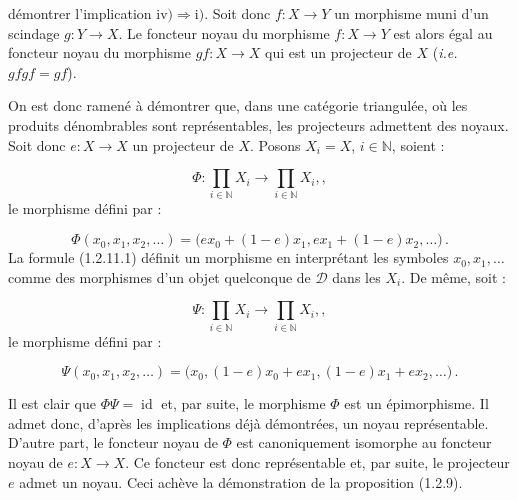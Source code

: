\clearpage
{}%
\begingroup
\small
\setlength{\emergencystretch}{1.5em}%
\setlength{\abovedisplayskip}{4pt plus 2pt minus 2pt}%
\setlength{\belowdisplayskip}{4pt plus 2pt minus 2pt}%

démontrer l'implication $\mathrm{iv)}\Longrightarrow\mathrm{i)}$. Soit donc
$f\colon X\longrightarrow Y$ un morphisme muni d'un scindage
$g\colon Y\longrightarrow X$. Le foncteur noyau du morphisme
$f\colon X\longrightarrow Y$ est alors égal au foncteur noyau du morphisme
$gf\colon X\longrightarrow X$ qui est un projecteur de $X$
({\itshape i.e.} $gfgf=gf$).

On est donc ramené à démontrer que, dans une catégorie triangulée, où les
produits dénombrables sont représentables, les projecteurs admettent des
noyaux. Soit donc $e\colon X\longrightarrow X$ un projecteur de $X$.
Posons $X_i=X$, $i\in\mathbb N$, soient :

\[
  \Phi\colon\prod_{i\in\mathbb N}X_i\longrightarrow
  \prod_{i\in\mathbb N}X_i, ,
\]
le morphisme défini par :

\begin{equation}
  \Phi(x_0,x_1,x_2,\ldots)
  =\bigl(ex_0+(1-e)x_1,ex_1+(1-e)x_2,\ldots\bigr)\,.
  \tag{1.2.11.1}
\end{equation}
La formule (1.2.11.1) définit un morphisme en interprétant les symboles
$x_0,x_1,\ldots$ comme des morphismes d'un objet quelconque de
$\mathcal D$ dans les $X_i$. De même, soit :

\[
  \Psi\colon\prod_{i\in\mathbb N}X_i\longrightarrow
  \prod_{i\in\mathbb N}X_i, ,
\]
le morphisme défini par :

\begin{equation}
  \Psi(x_0,x_1,x_2,\ldots)
  =\bigl(x_0,(1-e)x_0+ex_1,(1-e)x_1+ex_2,\ldots\bigr)\,.
  \tag{1.2.11.2}
\end{equation}

Il est clair que $\Phi\Psi=\operatorname{id}$ et, par suite, le morphisme
$\Phi$ est un épimorphisme. Il admet donc, d'après les implications déjà
démontrées, un noyau représentable. D'autre part, le foncteur noyau de
$\Phi$ est canoniquement isomorphe au foncteur noyau de
$e\colon X\longrightarrow X$. Ce foncteur est donc représentable et, par
suite, le projecteur $e$ admet un noyau. Ceci achève la démonstration de la
proposition (1.2.9).

